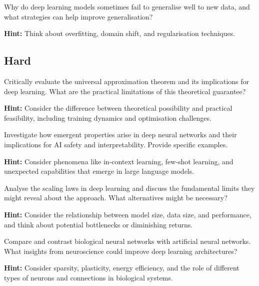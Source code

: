 \begin{problem}
Why do deep learning models sometimes fail to generalise well to new data, and what strategies can help improve generalisation?

\textbf{Hint:} Think about overfitting, domain shift, and regularisation techniques.
\end{problem}

\subsection*{Hard}

\begin{problem}
Critically evaluate the universal approximation theorem and its implications for deep learning. What are the practical limitations of this theoretical guarantee?

\textbf{Hint:} Consider the difference between theoretical possibility and practical feasibility, including training dynamics and optimisation challenges.
\end{problem}

\begin{problem}
Investigate how emergent properties arise in deep neural networks and their implications for AI safety and interpretability. Provide specific examples.

\textbf{Hint:} Consider phenomena like in-context learning, few-shot learning, and unexpected capabilities that emerge in large language models.
\end{problem}

\begin{problem}
Analyse the scaling laws in deep learning and discuss the fundamental limits they might reveal about the approach. What alternatives might be necessary?

\textbf{Hint:} Consider the relationship between model size, data size, and performance, and think about potential bottlenecks or diminishing returns.
\end{problem}

\begin{problem}
Compare and contrast biological neural networks with artificial neural networks. What insights from neuroscience could improve deep learning architectures?

\textbf{Hint:} Consider sparsity, plasticity, energy efficiency, and the role of different types of neurons and connections in biological systems.
\end{problem}

